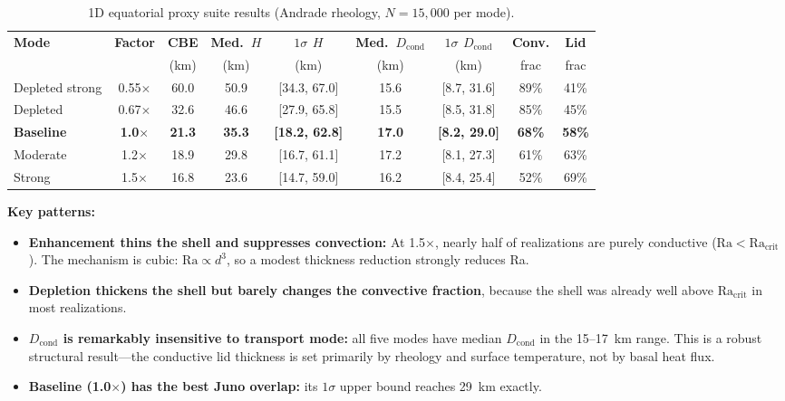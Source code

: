 \documentclass[11pt,letterpaper]{article}
\begin{document}
\begin{table}[htbp]
\centering
\caption{1D equatorial proxy suite results (Andrade rheology, $N = 15{,}000$ per mode).}
\label{tab:equatorial}
\small
\begin{tabular}{@{}lcccccccc@{}}
\toprule
\textbf{Mode} & \textbf{Factor} & \textbf{CBE} & \textbf{Med.\ $H$} & \textbf{$1\sigma$ $H$} & \textbf{Med.\ $D_\mathrm{cond}$} & \textbf{$1\sigma$ $D_\mathrm{cond}$} & \textbf{Conv.} & \textbf{Lid} \\
 & & (km) & (km) & (km) & (km) & (km) & frac & frac \\
\midrule
Depleted strong & 0.55$\times$ & 60.0 & 50.9 & [34.3, 67.0] & 15.6 & [8.7, 31.6] & 89\% & 41\% \\
Depleted & 0.67$\times$ & 32.6 & 46.6 & [27.9, 65.8] & 15.5 & [8.5, 31.8] & 85\% & 45\% \\
\textbf{Baseline} & \textbf{1.0$\times$} & \textbf{21.3} & \textbf{35.3} & \textbf{[18.2, 62.8]} & \textbf{17.0} & \textbf{[8.2, 29.0]} & \textbf{68\%} & \textbf{58\%} \\
Moderate & 1.2$\times$ & 18.9 & 29.8 & [16.7, 61.1] & 17.2 & [8.1, 27.3] & 61\% & 63\% \\
Strong & 1.5$\times$ & 16.8 & 23.6 & [14.7, 59.0] & 16.2 & [8.4, 25.4] & 52\% & 69\% \\
\bottomrule
\end{tabular}
\end{table}

\textbf{Key patterns:}
\begin{itemize}[nosep]
  \item \textbf{Enhancement thins the shell and suppresses convection:} At 1.5$\times$, nearly half of realizations are purely conductive ($\mathrm{Ra} < \mathrm{Ra_{crit}}$). The mechanism is cubic: $\mathrm{Ra} \propto d^3$, so a modest thickness reduction strongly reduces Ra.
  \item \textbf{Depletion thickens the shell but barely changes the convective fraction}, because the shell was already well above $\mathrm{Ra_{crit}}$ in most realizations.
  \item \textbf{$D_\mathrm{cond}$ is remarkably insensitive to transport mode:} all five modes have median $D_\mathrm{cond}$ in the 15--17~km range. This is a robust structural result---the conductive lid thickness is set primarily by rheology and surface temperature, not by basal heat flux.
  \item \textbf{Baseline (1.0$\times$) has the best Juno overlap:} its $1\sigma$ upper bound reaches 29~km exactly.
\end{itemize}
\end{document}
